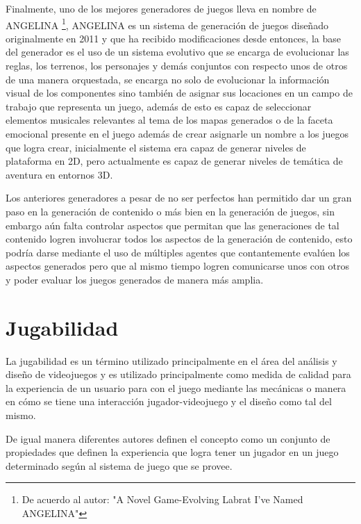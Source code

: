 Finalmente, uno de los mejores generadores de juegos lleva en nombre
de ANGELINA \cite{cook2011multi} %
\footnote{De acuerdo al autor: "A Novel Game-Evolving Labrat I've Named
ANGELINA"}, ANGELINA es un sistema de generación de juegos diseñado
originalmente en 2011 y que ha recibido modificaciones desde entonces, la base
del generador es el uso de un sistema evolutivo que se encarga de evolucionar
las reglas, los terrenos, los personajes y demás conjuntos con respecto unos de
otros de una manera orquestada, se encarga no solo de evolucionar la
información visual de los componentes sino también de asignar sus locaciones en
un campo de trabajo que representa un juego, además de esto es capaz de
seleccionar elementos musicales relevantes al tema de los mapas generados o de
la faceta emocional presente en el juego además de crear asignarle un nombre a
los juegos que logra crear, inicialmente el sistema era capaz de generar niveles
de plataforma en 2D, pero actualmente es capaz de generar niveles de temática de
aventura en entornos 3D.

Los anteriores generadores a pesar de no ser perfectos han permitido dar un gran
paso en la generación de contenido o más bien en la generación de juegos, sin
embargo aún falta controlar aspectos que permitan que las generaciones de tal
contenido logren involucrar todos los aspectos de la generación de contenido,
esto podría darse mediante el uso de múltiples agentes que contantemente evalúen
los aspectos generados pero que al mismo tiempo logren comunicarse unos con
otros y poder evaluar los juegos generados de manera más amplia.

\section{Jugabilidad}
\label{section:playability}

La jugabilidad es un término utilizado principalmente en el área del análisis y
diseño de videojuegos y es utilizado principalmente como medida de calidad para
la experiencia de un usuario para con el juego mediante las mecánicas o manera
en cómo se tiene una interacción jugador-videojuego y el diseño como tal del mismo.

De igual manera diferentes autores definen el concepto como un conjunto de
propiedades que definen la experiencia que logra tener un jugador en un juego
determinado según al sistema de juego que se provee.

